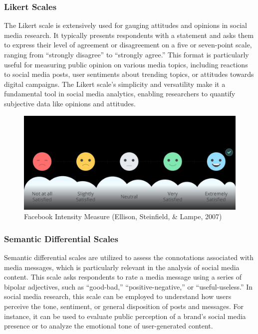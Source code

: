 \documentclass[
]{book}
\begin{document}
\subsubsection*{Likert Scales}\label{likert-scales}

The Likert scale is extensively used for gauging attitudes and opinions in social media research. It typically presents respondents with a statement and asks them to express their level of agreement or disagreement on a five or seven-point scale, ranging from ``strongly disagree'' to ``strongly agree.'' This format is particularly useful for measuring public opinion on various media topics, including reactions to social media posts, user sentiments about trending topics, or attitudes towards digital campaigns. The Likert scale's simplicity and versatility make it a fundamental tool in social media analytics, enabling researchers to quantify subjective data like opinions and attitudes.

\begin{figure}
\centering
\includegraphics[width=1\linewidth,height=\textheight,keepaspectratio]{images/likert.jpg}
\caption{Facebook Intensity Measure (Ellison, Steinfield, \& Lampe, 2007)}
\end{figure}

\subsubsection*{Semantic Differential Scales}\label{semantic-differential-scales}

Semantic differential scales are utilized to assess the connotations associated with media messages, which is particularly relevant in the analysis of social media content. This scale asks respondents to rate a media message using a series of bipolar adjectives, such as ``good-bad,'' ``positive-negative,'' or ``useful-useless.'' In social media research, this scale can be employed to understand how users perceive the tone, sentiment, or general disposition of posts and messages. For instance, it can be used to evaluate public perception of a brand's social media presence or to analyze the emotional tone of user-generated content.
\end{document}

